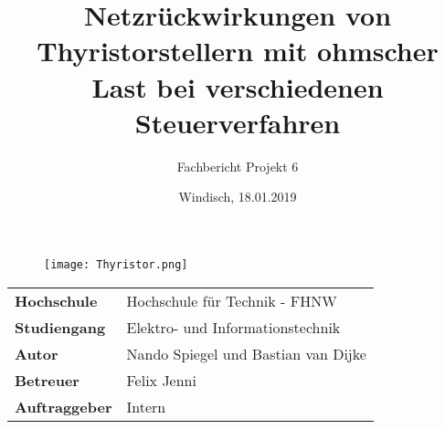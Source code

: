 \documentclass[final]{fhnwreport}       %
\title{Netzrückwirkungen von Thyristorstellern mit ohmscher Last bei verschiedenen Steuerverfahren}          %
\author{Fachbericht Projekt 6}          %
\date{Windisch, 18.01.2019}             %
\begin{document}
\maketitle

\vspace*{-1cm}						    %
\vfill
\begin{figure}[H]
\centering
\texttt{[image: Thyristor.png]}
\end{figure}
\vfill

{
\renewcommand\arraystretch{2}
\begin{center}
\begin{tabular}{>{\bf}p{4cm} l}
Hochschule                 &    Hochschule für Technik - FHNW\\
Studiengang                &    Elektro- und Informationstechnik\\
Autor   		           & 	Nando Spiegel und Bastian van Dijke\\
Betreuer                   &    Felix Jenni\\
Auftraggeber               &    Intern\\
\end{tabular}
\end{center}
}

\clearpage
			
\thispagestyle{empty}

%

\tableofcontents
\clearpage










{\sloppypar
\printbibliography[heading=bibintoc]
\label{sec:lit}
}
\listoffigures
\listoftables


\ifdraft{%
\newpage
\clearpage
}
{%
}
\end{document}
